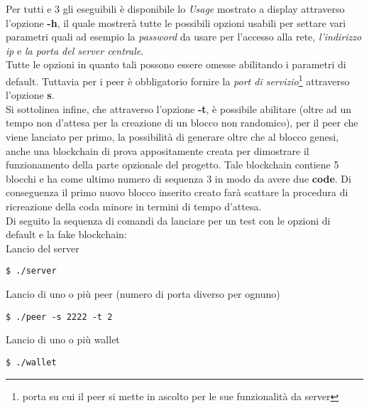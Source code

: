 Per tutti e 3 gli eseguibili è disponibile lo \textit{Usage} mostrato a display attraverso l'opzione \textbf{-h}, il quale mostrerà tutte le possibili opzioni usabili per settare vari parametri quali ad esempio la \textit{password} da usare per l'accesso alla rete, \textit{l'indirizzo ip} e \textit{la porta del server centrale}. \\

Tutte le opzioni in quanto tali possono essere omesse abilitando i parametri di default. Tuttavia per i peer è obbligatorio fornire la \textit{port di servizio}\footnote{porta su cui il peer si mette in ascolto per le sue funzionalità da server} attraverso l'opzione \textbf{\-s}.\\

Si sottolinea infine, che attraverso l'opzione \textbf{-t}, è possibile abilitare (oltre ad un tempo non d'attesa per la creazione di un blocco non randomico), per il peer che viene lanciato per primo, la possibilità di generare oltre che al blocco genesi, anche una blockchain di prova appositamente creata per dimostrare il funzionamento della parte opzionale del progetto. Tale blockchain contiene 5 blocchi e ha come ultimo numero di sequenza 3 in modo da avere due \textbf{code}. Di conseguenza il primo nuovo blocco inserito creato farà scattare la procedura di ricreazione della coda minore in termini di tempo d'attesa. \\

Di seguito la sequenza di comandi da lanciare per un test con le opzioni di default e la fake blockchain:\\

Lancio del server
\begin{lstlisting}
$ ./server
\end{lstlisting}

Lancio di uno o più peer (numero di porta diverso per ognuno)
\begin{lstlisting}
$ ./peer -s 2222 -t 2
\end{lstlisting}

Lancio di uno o più wallet
\begin{lstlisting}
$ ./wallet
\end{lstlisting}



